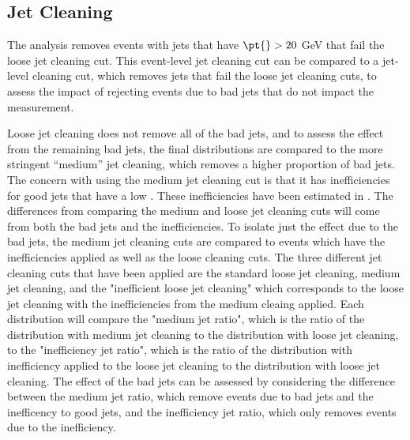 \subsection{Jet Cleaning}
\label{sec:GBJ2:Cleaning}

The analysis removes events with jets that have $\pt{}>20$ GeV  that fail the loose jet cleaning cut.
This event-level jet cleaning cut can be compared to a jet-level cleaning cut, which removes jets that fail the loose jet cleaning cuts, to assess the impact of rejecting events due to bad jets that do not impact the measurement.

Loose jet cleaning does not remove all of the bad jets, and to assess the effect from the remaining bad jets, the final distributions are compared to the more stringent ``medium'' jet cleaning, which  removes a higher proportion of bad jets. 
The concern with using the medium jet cleaning cut is that it has inefficiencies for good jets that have a low \pt{}.
These inefficiencies have been estimated in \cite{ref:JES}.
The differences from comparing the medium and loose jet cleaning cuts will come from both the bad jets and the inefficiencies.
To isolate just the effect due to the bad jets, the medium jet cleaning cuts are compared to events which have  the inefficiencies applied as well as the loose cleaning cuts. 
The three different jet cleaning cuts that have been applied are the standard loose jet cleaning, medium jet cleaning, and the "inefficient loose jet cleaning" which corresponds to the loose jet cleaning with the inefficiencies from the medium cleaing applied. 
Each distribution will compare the "medium jet ratio", which is the ratio of the distribution with medium jet cleaning to the distribution with loose jet cleaning, to the "inefficiency jet ratio", which is the ratio of the distribution with inefficiency applied to the loose jet cleaning to the distribution with loose jet cleaning. 
The effect of the bad jets can be assessed by considering the difference between the medium jet ratio, which remove events due to bad jets and the inefficency to good jets, and the inefficiency jet ratio, which only removes events due to the inefficiency. 



